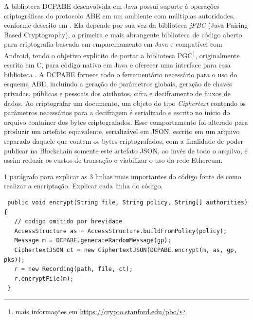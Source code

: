 \documentclass[a4paper,11pt]{article}
\begin{document}
A biblioteca DCPABE desenvolvida em Java possui suporte à operações criptográficas do protocolo ABE em um ambiente com múltiplas autoridades, conforme descrito em \cite{Lewko2011}.
Ela depende por sua vez da biblioteca \emph{jPBC} (Java Pairing Based Cryptography), a primeira e mais abrangente biblioteca de código aberto para criptografia baseada em emparelhamento em Java e compatível com Android, tendo o objetivo explícito de portar a biblioteca PGC\footnote{mais informações em \href{https://crypto.stanford.edu/pbc/}{https://crypto.stanford.edu/pbc/}}, originalmente escrita em C, para código nativo em Java e oferecer uma interface para essa biblioteca \cite{DeCaro2011}.
A DCPABE fornece todo o ferramentário necessário para o uso do esquema ABE, incluindo a geração de parâmetros globais, geração de chaves privadas, públicas e pessoais dos atributos, cifra e deciframento de fluxos de dados.
Ao criptografar um documento, um objeto do tipo \emph{Ciphertext} contendo os parâmetros necessários para a decifragem é serializado e escrito no início do arquivo container dos bytes criptografados.
Esse comportamento foi alterado para produzir um artefato equivalente, serializável em JSON, escrito em um arquivo separado daquele que contem os bytes criptografados, com a finalidade de poder publicar na Blockchain somente este artefato JSON, ao invés de todo o arquivo, e assim reduzir os custos de transação e viabilizar o uso da rede Ethereum.

{\color{Magenta} 1 parágrafo para explicar as 3 linhas mais importantes do código fonte de como realizar a encriptação. Explicar cada linha do código.}


\begin{lstlisting}
 public void encrypt(String file, String policy, String[] authorities) {
   // codigo omitido por brevidade
   AccessStructure as = AccessStructure.buildFromPolicy(policy);
   Message m = DCPABE.generateRandomMessage(gp);
   CiphertextJSON ct = new CiphertextJSON(DCPABE.encrypt(m, as, gp, pks));
   r = new Recording(path, file, ct);
   r.encryptFile(m);
 }
\end{lstlisting}

\end{document}

